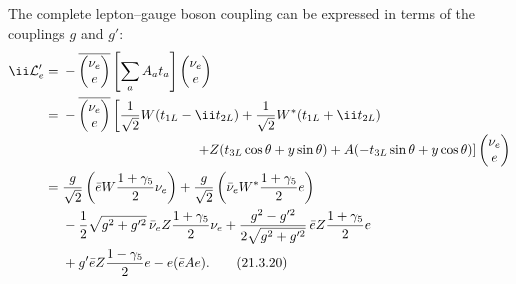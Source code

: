 The complete lepton--gauge boson coupling can be expressed in terms of the couplings $g$ and $g'$:
\begin{align}
\ii\mathcal{L}'_e
={}&-\overline{\begin{pmatrix}\nu_e\\e\end{pmatrix}}
\left[\sum_a\sl A_a t_a\right]
\begin{pmatrix}\nu_e\\e\end{pmatrix}
\notag\\
={}&-\overline{\begin{pmatrix}\nu_e\\e\end{pmatrix}}
\left[
\frac{1}{\sqrt{2}}\sl W(t_{1L}-\ii t_{2L})
+\frac{1}{\sqrt{2}}\sl W^*(t_{1L}+\ii t_{2L})
\right.
\notag\\[-2pt]
&\left.\hspace{35mm}
+\sl Z(t_{3L}\cos\theta+y\sin\theta)
+\sl A(-t_{3L}\sin\theta+y\cos\theta)
\right]
\begin{pmatrix}\nu_e\\e\end{pmatrix}
\notag\\
={}&\frac{g}{\sqrt{2}}
\left(\bar e\sl W\frac{1+\gamma_5}{2}\nu_e\right)
+\frac{g}{\sqrt{2}}
\left(\bar\nu_e\sl W^*\frac{1+\gamma_5}{2}e\right)
\notag\\
&-\frac{1}{2}\sqrt{g^2+g'^2}\,
\bar\nu_e\sl Z\frac{1+\gamma_5}{2}\nu_e
+\frac{g^2-g'^2}{2\sqrt{g^2+g'^2}}\,
\bar e\sl Z\frac{1+\gamma_5}{2}e
\notag\\
&+g'\bar e\sl Z\frac{1-\gamma_5}{2}e
-e(\bar e\sl A e).
\tag{21.3.20}\label{eq:21.3.20}
\end{align}

